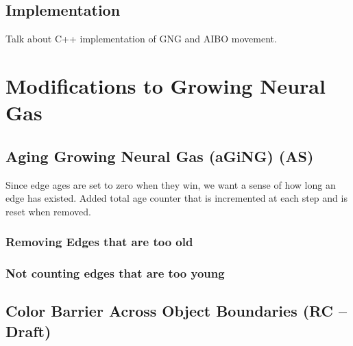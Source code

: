 \documentclass{article}
\renewcommand{\|}{\origbar} %
\begin{document}


\subsection{Implementation}

Talk about C++ implementation of GNG and AIBO movement.


\section{Modifications to Growing Neural Gas}

\subsection{Aging Growing Neural Gas (aGiNG) (AS)}

Since edge ages are set to zero when they win, we want a sense of how long an edge has existed. Added total age counter that is incremented at each step and is reset when removed.

\subsubsection{Removing Edges that are too old}

\subsubsection{Not counting edges that are too young}

\subsection{Color Barrier Across Object Boundaries (RC -- Draft)}
\end{document}
